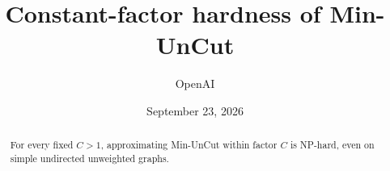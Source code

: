 \documentclass[11pt]{article}
\title{Constant-factor hardness of Min-UnCut}
\author{OpenAI}
\date{September 23, 2026}
\numberwithin{equation}{section}
\theoremstyle{definition}
\theoremstyle{remark}
\begin{document}
\maketitle
\begin{abstract}
For every fixed \(C>1\), approximating Min-UnCut within factor \(C\) is
NP-hard, even on simple undirected unweighted graphs.
\end{abstract}
\tableofcontents









\end{document}
